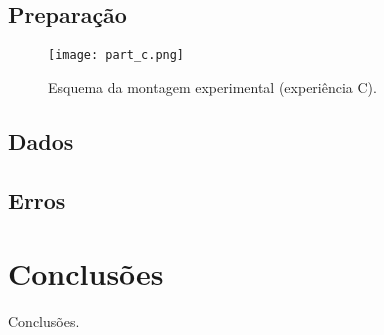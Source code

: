 \documentclass{report}
\begin{document}
\section{Preparação}
\begin{figure}
	\centering
	\texttt{[image: part\_c.png]}
	\caption{Esquema da montagem experimental (experiência C).}
\end{figure}

\section{Dados}

\section{Erros}

\chapter{Conclusões}
Conclusões.
\end{document}
